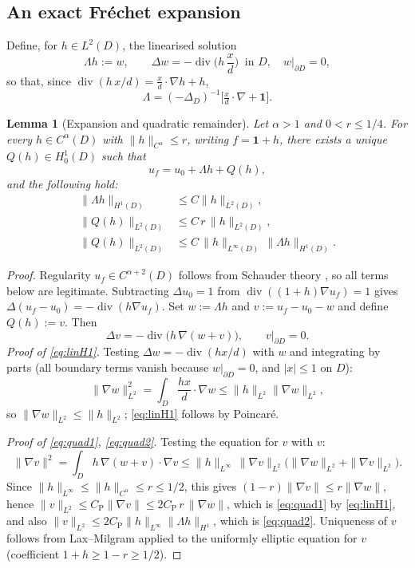 \documentclass[11pt]{amsart}
\newtheorem{lemma}[theorem]{Lemma}
\newcommand{\1}{\mathbf{1}}
\newcommand{\divop}{\operatorname{div}}
\begin{document}
\subsection{An exact Fr\'echet expansion}
Define, for $h\in L^2(D)$, the linearised solution
\begin{equation}\label{eq:Lambda}
\Lambda h:=w,\qquad \Delta w=-\divop\Big(h\,\frac{x}{d}\Big)\ \text{ in }D,
\quad w|_{\partial D}=0,
\end{equation}
so that, since $\divop(h\,x/d)=\frac{x}{d}\cdot\nabla h+h$,
\[
\Lambda=(-\Delta_D)^{-1}\Big[\tfrac{x}{d}\cdot\nabla+\1\Big].
\]

\begin{lemma}[Expansion and quadratic remainder]\label{lem:expansion}
Let $\alpha>1$ and $0<r\le1/4$. For every $h\in C^\alpha(D)$ with
$\|h\|_{C^\alpha}\le r$, writing $f=\1+h$, there exists a unique
$Q(h)\in H^1_0(D)$ such that
\begin{equation}\label{eq:expansion}
u_f=u_0+\Lambda h+Q(h),
\end{equation}
and the following hold:
\begin{align}
\|\Lambda h\|_{H^1(D)}&\le C\|h\|_{L^2(D)},\label{eq:linH1}\\
\|Q(h)\|_{L^2(D)}&\le C\,r\,\|h\|_{L^2(D)},\label{eq:quad1}\\
\|Q(h)\|_{L^2(D)}&\le C\,\|h\|_{L^\infty(D)}\,\|\Lambda h\|_{H^1(D)}.
\label{eq:quad2}
\end{align}
\end{lemma}

\begin{proof}
Regularity $u_f\in C^{\alpha+2}(D)$ follows from Schauder theory
\cite[Thm.~8.32]{GT01}, so all terms below are legitimate. Subtracting
$\Delta u_0=1$ from $\divop((1+h)\nabla u_f)=1$ gives
$\Delta(u_f-u_0)=-\divop(h\nabla u_f)$. Set $w:=\Lambda h$ and
$v:=u_f-u_0-w$ and define $Q(h):=v$. Then
\[
\Delta v=-\divop\big(h\,\nabla(w+v)\big),\qquad v|_{\partial D}=0 .
\]
\emph{Proof of \eqref{eq:linH1}.} Testing $\Delta w=-\divop(hx/d)$ with $w$
and integrating by parts (all boundary terms vanish because $w|_{\partial D}=0$,
and $|x|\le1$ on $D$):
\[
\|\nabla w\|_{L^2}^2=\int_D \frac{h x}{d}\cdot\nabla w
\le \|h\|_{L^2}\|\nabla w\|_{L^2},
\]
so $\|\nabla w\|_{L^2}\le\|h\|_{L^2}$; \eqref{eq:linH1} follows by Poincar\'e.

\smallskip
\emph{Proof of \eqref{eq:quad1}, \eqref{eq:quad2}.} Testing the equation for
$v$ with $v$:
\[
\|\nabla v\|^2=\int_D h\,\nabla(w+v)\cdot\nabla v
\le \|h\|_{L^\infty}\,\|\nabla v\|_{L^2}\big(\|\nabla w\|_{L^2}+\|\nabla v\|_{L^2}\big).
\]
Since $\|h\|_{L^\infty}\le\|h\|_{C^\alpha}\le r\le 1/2$, this gives
$(1-r)\|\nabla v\|\le r\|\nabla w\|$, hence
$\|v\|_{L^2}\le C_\mathrm{P}\|\nabla v\|\le 2C_\mathrm P\,r\,\|\nabla w\|$,
which is \eqref{eq:quad1} by \eqref{eq:linH1}, and also
$\|v\|_{L^2}\le 2C_\mathrm P\|h\|_{L^\infty}\|\Lambda h\|_{H^1}$, which is
\eqref{eq:quad2}. Uniqueness of $v$ follows from Lax--Milgram applied to the
 uniformly elliptic equation for $v$ (coefficient $1+h\ge1-r\ge1/2$).
\end{proof}
\end{document}
